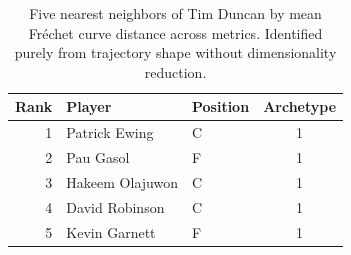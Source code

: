 \begin{table}[htbp]
  \centering\small
  \begin{tabular}{rllc}
    \toprule
    Rank & Player & Position & Archetype \\
    \midrule
    1 & Patrick Ewing & C & 1 \\
    2 & Pau Gasol & F & 1 \\
    3 & Hakeem Olajuwon & C & 1 \\
    4 & David Robinson & C & 1 \\
    5 & Kevin Garnett & F & 1 \\
    \bottomrule
  \end{tabular}
  \caption{Five nearest neighbors of Tim Duncan by mean Fr\'{e}chet curve distance across metrics. Identified purely from trajectory shape without dimensionality reduction.}
  \label{tab:Tim_Duncan_frechet_curve_neighbors}
\end{table}

